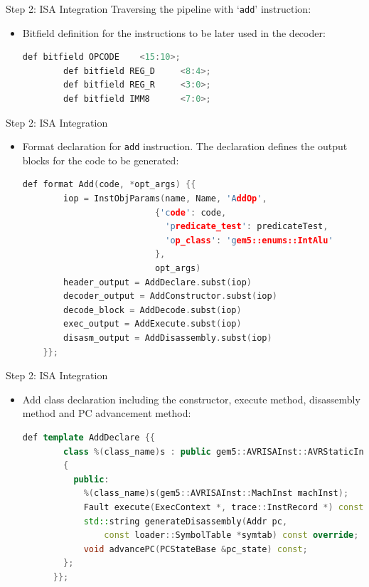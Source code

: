 \begin{frame}[fragile]{Step 2: ISA Integration}
	Traversing the pipeline with `\texttt{add}' instruction:
	\begin{itemize}
		\item Bitfield definition for the instructions to be later used in the decoder:
		      \begin{lstlisting}[language=C++]
        def bitfield OPCODE    <15:10>;
        def bitfield REG_D     <8:4>;
        def bitfield REG_R     <3:0>;
        def bitfield IMM8      <7:0>;
      \end{lstlisting}
	\end{itemize}
\end{frame}

\begin{frame}[fragile]{Step 2: ISA Integration}
	\begin{itemize}
		\item Format declaration for \texttt{add} instruction. The declaration defines the output blocks for the code to be generated:
		      \begin{lstlisting}[language=C++]
      def format Add(code, *opt_args) {{
        iop = InstObjParams(name, Name, 'AddOp',
                          {'code': code,
                            'predicate_test': predicateTest,
                            'op_class': 'gem5::enums::IntAlu'
                          },
                          opt_args)
        header_output = AddDeclare.subst(iop)
        decoder_output = AddConstructor.subst(iop)
        decode_block = AddDecode.subst(iop)
        exec_output = AddExecute.subst(iop)
        disasm_output = AddDisassembly.subst(iop)
    }};
    \end{lstlisting}
	\end{itemize}
\end{frame}

\begin{frame}[fragile]{Step 2: ISA Integration}
	\begin{itemize}
		\item Add class declaration including the constructor, execute method, disassembly method and PC advancement method:
		      \begin{lstlisting}[language=C++]
      def template AddDeclare {{
        class %(class_name)s : public gem5::AVRISAInst::AVRStaticInst
        {
          public:
            %(class_name)s(gem5::AVRISAInst::MachInst machInst);
            Fault execute(ExecContext *, trace::InstRecord *) const override;
            std::string generateDisassembly(Addr pc,
                const loader::SymbolTable *symtab) const override;
            void advancePC(PCStateBase &pc_state) const;
        };
      }};
    \end{lstlisting}
	\end{itemize}
\end{frame}

